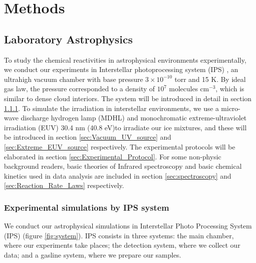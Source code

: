 \chapter{\protect Methods}
\label{methods}

\section{Laboratory Astrophysics}
To study the chemical reactivities in astrophysical environments experimentally,
we conduct our experiments in Interstellar photoprocessing system (IPS) \cite{chen2013vacuum},
an ultrahigh vacuum chamber with base pressure $3 \times 10^{-10}$ torr and 15 K. By ideal gas law, the pressure corresponded to a density of $10^7$ molecules cm$^{-3}$, which is similar to dense cloud interiors.
The system will be introduced in detail in section \ref{sec:IPS_system}.
To simulate the irradiation in interstellar environments,
we use a micro-wave discharge hydrogen lamp (MDHL) and monochromatic extreme-ultraviolet irradiation (EUV) 30.4 nm (40.8 eV)to irradiate our ice mixtures,
and these will be introduced in section \ref{sec:Vacuum_UV_source} and \ref{sec:Extreme_EUV_source} respectively.
The experimental protocols will be elaborated in section \ref{sec:Experimental_Protocol}.
For some non-physic background readers, basic theories of Infrared spectroscopy and basic chemical kinetics used in data analysis are included in section \ref{sec:spectroscopy} and \ref{sec:Reaction_Rate_Laws} respectively.\\

\subsection{Experimental simulations by IPS system}
\label{sec:IPS_system}

We conduct our astrophysical simulations in Interstellar Photo Processing System (IPS) (figure \ref{fig:system}). IPS consists in three systems: the main chamber, where our experiments take places; the detection system, where we collect our data; and a gasline system, where we prepare our samples.

